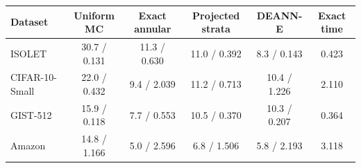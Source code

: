 \begin{tabular}{lccccc}
\toprule
Dataset & Uniform MC & Exact annular & Projected strata & DEANN-E & Exact time \\
\midrule
ISOLET & 30.7 / 0.131 & 11.3 / 0.630 & 11.0 / 0.392 & 8.3 / 0.143 & 0.423 \\
CIFAR-10-Small & 22.0 / 0.432 & 9.4 / 2.039 & 11.2 / 0.713 & 10.4 / 1.226 & 2.110 \\
GIST-512 & 15.9 / 0.118 & 7.7 / 0.553 & 10.5 / 0.370 & 10.3 / 0.207 & 0.364 \\
Amazon & 14.8 / 1.166 & 5.0 / 2.596 & 6.8 / 1.506 & 5.8 / 2.193 & 3.118 \\
\bottomrule
\end{tabular}
